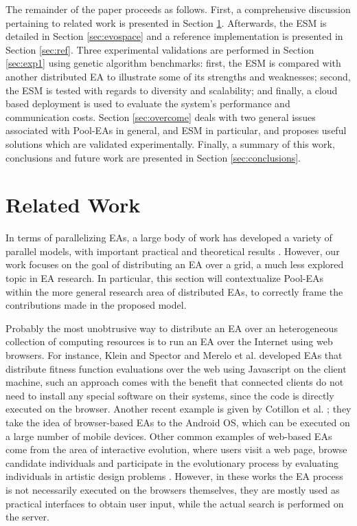 The remainder of the paper proceeds as follows.
First, a comprehensive discussion pertaining to related work is presented in Section \ref{sec:related}.
Afterwards, the ESM is detailed in Section \ref{sec:evospace} and a reference implementation is presented in Section \ref{sec:ref}.
Three experimental validations are performed in Section \ref{sec:exp1} using genetic algorithm benchmarks:
first, the ESM is compared with another distributed EA to illustrate some of its
strengths and weaknesses; second, the ESM is tested with regards to diversity and scalability;
and finally, a cloud based deployment is used to evaluate the system's performance and communication costs.
Section \ref{sec:overcome} deals with two general issues associated with Pool-EAs in general, and ESM in particular,
and proposes useful solutions which are validated experimentally.
Finally, a summary of this work, conclusions and future work are presented in Section \ref{sec:conclusions}.
 

\section{Related Work}
\label{sec:related}
In terms of parallelizing EAs, a large body of work has developed a variety of parallel models, with
important practical and theoretical results \cite{parallelEA}.
However, our work focuses on the goal of distributing an EA over a grid, a much less explored topic in EA research.
In particular, this section will contextualize Pool-EAs within the more general research area of distributed EAs,
to correctly frame the contributions made in the proposed model.

Probably the most unobtrusive way to distribute an EA over an heterogeneous collection of computing resources is to run an EA over the Internet using web browsers.
For instance, Klein and Spector \cite{spector:2007} and Merelo et al. \cite{merelo:2008} developed EAs that distribute fitness function evaluations over the web using Javascript on the client machine, such an approach comes with the benefit that connected clients do not need to install any special software on their systems,
since the code is directly executed on the browser.
Another recent example is given by Cotillon et al. \cite{cotillon:2012}; they take the idea of browser-based EAs to the Android OS, which can be
executed on a large number of mobile devices.
Other common examples of web-based EAs come from the area of interactive evolution, where users visit a web page, browse candidate individuals
and participate in the evolutionary process by evaluating individuals in artistic design problems \cite{Musart,Fire,langdon:2004,picbreeder}.
However, in these works the EA process is not necessarily executed on the browsers themselves, they are mostly used as practical interfaces
to obtain user input, while the actual search is performed on the server.


